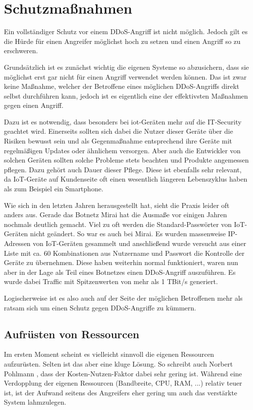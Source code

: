 \chapter{Schutzmaßnahmen}
\label{chap:kapitel3}
Ein vollständiger Schutz vor einem DDoS-Angriff ist nicht möglich. Jedoch gilt es die Hürde für einen Angreifer möglichst hoch zu setzen und einen Angriff so zu erschweren.

Grundsätzlich ist es zunächst wichtig die eigenen Systeme so abzusichern, dass sie möglichst erst gar nicht für einen Angriff verwendet werden können. Das ist zwar keine Maßnahme, welcher der Betroffene eines möglichen DDoS-Angriffs direkt selbst durchführen kann, jedoch ist es eigentlich eine der effektivsten Maßnahmen gegen einen Angriff.

Dazu ist es notwendig, dass besonders bei \ac{iot}-Geräten mehr auf die IT-Security geachtet wird. Einerseits sollten sich dabei die Nutzer dieser Geräte über die Risiken bewusst sein und als Gegenmaßnahme entsprechend ihre Geräte mit regelmäßigen Updates oder ähnlichem versorgen.
Aber auch die Entwickler von solchen Geräten sollten solche Probleme stets beachten und Produkte angemessen pflegen. Dazu gehört auch Dauer dieser Pflege. Diese ist ebenfalls sehr relevant, da IoT-Geräte auf Kundenseite oft einen wesentlich längeren Lebenszyklus haben als zum Beispiel ein Smartphone.

Wie sich in den letzten Jahren herausgestellt hat, sieht die Praxis leider oft anders aus. Gerade das Botnetz \glqq Mirai\grqq{} hat die Ausmaße vor einigen Jahren nochmals deutlich gemacht. Viel zu oft werden die Standard-Passwörter von IoT-Geräten nicht geändert. So war es auch bei Mirai. Es wurden massenweise IP-Adressen von IoT-Geräten gesammelt und anschließend wurde versucht aus einer Liste mit ca. 60 Kombinationen aus Nutzername und Passwort die Kontrolle der Geräte zu übernehmen. Diese haben weiterhin normal funktioniert, waren nun aber in der Lage als Teil eines Botnetzes einen DDoS-Angriff auszuführen. Es wurde dabei Traffic mit Spitzenwerten von mehr als 1 TBit/s generiert. \cite{Mirai}

Logischerweise ist es also auch auf der Seite der möglichen Betroffenen mehr als ratsam sich um einen Schutz gegen DDoS-Angriffe zu kümmern.

\section{Aufrüsten von Ressourcen}
\label{sec:k3rsc}
Im ersten Moment scheint es vielleicht sinnvoll die eigenen Ressourcen aufzurüsten. Selten ist das aber eine kluge Lösung. So schreibt auch Norbert Pohlmann \cite{Pohlmann2019}, dass der Kosten-Nutzen-Faktor dabei sehr gering ist. Während eine Verdopplung der eigenen Ressourcen (Bandbreite, CPU, RAM, ...) relativ teuer ist, ist der Aufwand seitens des Angreifers eher gering um auch das verstärkte System lahmzulegen.

